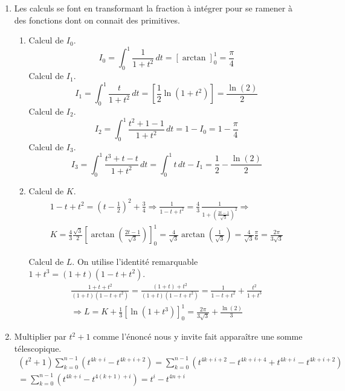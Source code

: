 \begin{enumerate}
  \item Les calculs se font en transformant la fraction à intégrer pour se ramener à des fonctions dont on connait des primitives.
\begin{enumerate}
  \item 
Calcul de $I_0$.
\begin{displaymath}
  I_0 = \int_0^1\frac{1}{1+t^2}\,dt = \left[ \arctan \right]_{0}^{1} = \frac{\pi}{4} 
\end{displaymath}
Calcul de $I_1$.
\begin{displaymath}
  I_1 = \int_0^1 \frac{t}{1+t^2}\,dt = \left[ \frac{1}{2}\ln(1+t^2)\right] = \frac{\ln(2)}{2} 
\end{displaymath}
Calcul de $I_2$.
\begin{displaymath}
  I_2 = \int_0^1 \frac{t^2+1-1}{1+t^2}\,dt = 1-I_0 = 1-\frac{\pi}{4} 
\end{displaymath}
Calcul de $I_3$.
\begin{displaymath}
  I_3 = \int_0^1 \frac{t^3+t-t}{1+t^2}\,dt = \int_0^1 t\,dt - I_1 = \frac{1}{2} - \frac{\ln(2)}{2} 
\end{displaymath}

  \item Calcul de $K$.
\begin{multline*}
1-t+t^2 = (t-\frac{1}{2})^2 + \frac{3}{4} \Rightarrow \frac{1}{1-t+t^2} = \frac{4}{3}\, \frac{1}{1+\left( \frac{2t-1}{\sqrt{3}}\right)^{2} } 
\Rightarrow \\
K = \frac{4}{3} \frac{\sqrt{3}}{2}\left[ \arctan\left( \frac{2t-1}{\sqrt{3}}\right) \right]_{0}^{1}=\frac{4}{\sqrt{3}}\arctan(\frac{1}{\sqrt{3}}) 
= \frac{4}{\sqrt{3}} \frac{\pi}{6} = \frac{2\pi}{3\sqrt{3}}
\end{multline*}

Calcul de $L$. On utilise l'identité remarquable $1+t^3 = (1+t)(1-t+t^2)$.
\begin{multline*}
  \frac{1+t+t^2}{(1+t)(1-t+t^2)} = \frac{(1+t) + t^2 }{(1+t)(1-t+t^2)} = \frac{1}{1-t+t^2} + \frac{t^2}{1+t^3} \\
\Rightarrow L = K + \frac{1}{3}\left[ \ln(1+t^3)\right]_{0}^{1} 
= \frac{2\pi}{3\sqrt{3}} + \frac{\ln(2)}{3}
\end{multline*}
\end{enumerate}

  \item Multiplier par $t^2+1$ comme l'énoncé nous y invite fait apparaître une somme télescopique.
\begin{multline*}
(t^2+1)\sum_{k=0}^{n-1}\left( t^{4k+i} - t^{4k+i+2}\right)
= \sum_{k=0}^{n-1}\left( t^{4k+i+2} - t^{4k+i+4} + t^{4k+i} - t^{4k+i+2}\right)\\
= \sum_{k=0}^{n-1}\left(t^{4k+i} - t^{4(k+1)+i}\right)
= t^{i} - t^{4n + i}
\end{multline*}


\end{enumerate}
